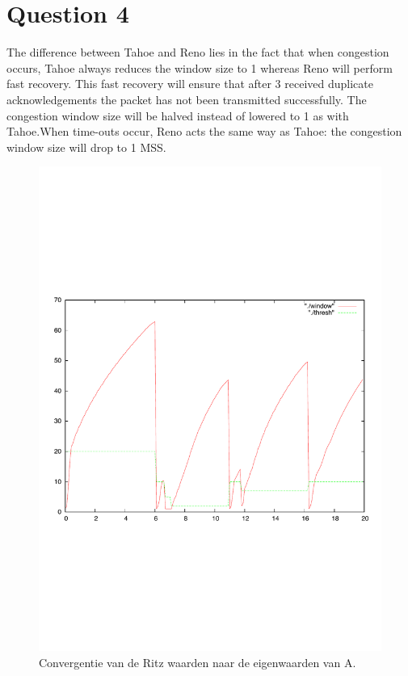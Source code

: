 \documentclass[a4paper]{report}
\newcommand{\opgave}[1]{\section{Question #1}}
\begin{document}
\opgave{4}
The difference between Tahoe and Reno lies in the fact that when congestion occurs, Tahoe always reduces the window size to 1 whereas Reno will perform fast recovery. This fast recovery will 
ensure that after 3 received duplicate acknowledgements the packet has not been transmitted successfully. The congestion window size will be halved instead of lowered to 1 as with Tahoe.When time-outs occur, Reno acts the same way as Tahoe: the congestion window size will drop to 1 MSS.


\begin{figure}[htb]
\centerline{\includegraphics{Exercise2/Question2_2.pdf}}
\caption{Convergentie van de Ritz waarden naar de eigenwaarden van A.}
\label{fig:figure7}
\end{figure}
\end{document}
